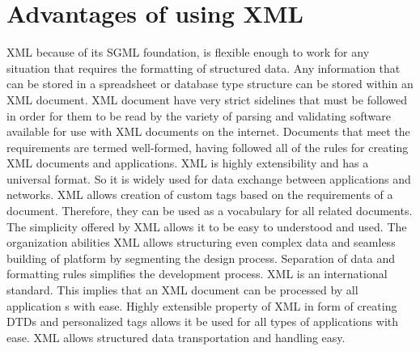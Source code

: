 \section{Advantages of using XML}
XML because of its SGML foundation, is flexible enough to work for any situation that requires the formatting of structured data. Any information that can be stored in a spreadsheet or database type structure can be stored within an XML document.
XML document have very strict sidelines that must be followed in order for them to be read by the variety of parsing and validating software available for use with XML documents on the internet. Documents that meet the requirements are termed well-formed, having followed all of the rules for creating XML documents and applications.
XML is highly extensibility and has a universal format. So it is  widely used for data exchange between applications and networks.
XML allows  creation of custom tags  based on the requirements of a document. Therefore, they can be used as a vocabulary for all related documents. 
The simplicity offered by XML allows it to be  easy to understood and used.
The organization abilities XML allows structuring even complex data and seamless building of  platform by segmenting the design process.
Separation of data and formatting rules simplifies the development process.
XML is an international standard. This implies that an XML document can be processed by all application s with ease.
Highly extensible property of XML in form of creating DTDs and personalized tags allows it be used for all types of applications with ease. XML allows structured data transportation and handling easy.